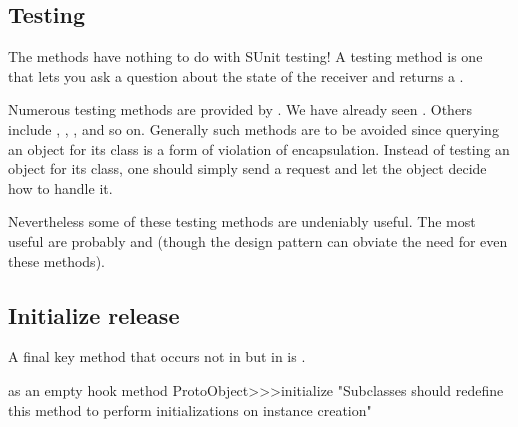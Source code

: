 \documentclass[a4paper,10pt,twoside]{book}
\begin{document}


\subsection{Testing}

The  methods have nothing to do with SUnit testing! A testing method is one that lets you ask a question about the state of the receiver and returns a .

Numerous testing methods are provided by . We have already seen . Others include , , ,  and so on. Generally such methods are to be avoided since querying an object for its class is a form of violation of encapsulation. Instead of testing an object for its class, one should simply send a request and let the object decide how to handle it.

Nevertheless some of these testing methods are undeniably useful. The most useful are probably  and  (though the \cite{Wool98a} design pattern can obviate the need for even these methods).


\subsection{Initialize release}

A final key method that occurs not in  but in  is .

\begin{method}{ as an empty hook method}
ProtoObject>>>initialize
   "Subclasses should redefine this method to perform initializations on instance creation"
\end{method}
\end{document}
